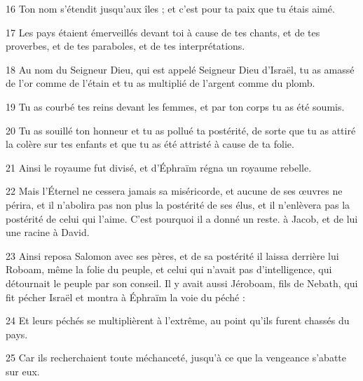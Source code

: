 \par 16 Ton nom s'étendit jusqu'aux îles ; et c'est pour ta paix que tu étais aimé.
\par 17 Les pays étaient émerveillés devant toi à cause de tes chants, et de tes proverbes, et de tes paraboles, et de tes interprétations.
\par 18 Au nom du Seigneur Dieu, qui est appelé Seigneur Dieu d'Israël, tu as amassé de l'or comme de l'étain et tu as multiplié de l'argent comme du plomb.
\par 19 Tu as courbé tes reins devant les femmes, et par ton corps tu as été soumis.
\par 20 Tu as souillé ton honneur et tu as pollué ta postérité, de sorte que tu as attiré la colère sur tes enfants et que tu as été attristé à cause de ta folie.
\par 21 Ainsi le royaume fut divisé, et d'Éphraïm régna un royaume rebelle.
\par 22 Mais l'Éternel ne cessera jamais sa miséricorde, et aucune de ses œuvres ne périra, et il n'abolira pas non plus la postérité de ses élus, et il n'enlèvera pas la postérité de celui qui l'aime. C'est pourquoi il a donné un reste. à Jacob, et de lui une racine à David.
\par 23 Ainsi reposa Salomon avec ses pères, et de sa postérité il laissa derrière lui Roboam, même la folie du peuple, et celui qui n'avait pas d'intelligence, qui détournait le peuple par son conseil. Il y avait aussi Jéroboam, fils de Nebath, qui fit pécher Israël et montra à Éphraïm la voie du péché :
\par 24 Et leurs péchés se multiplièrent à l'extrême, au point qu'ils furent chassés du pays.
\par 25 Car ils recherchaient toute méchanceté, jusqu'à ce que la vengeance s'abatte sur eux.


